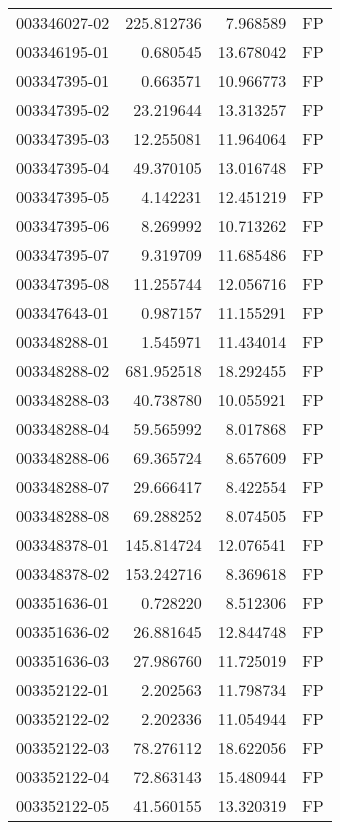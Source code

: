 \begin{tabular}{lrrl}
003346027-02 &  225.812736 &       7.968589 &   FP \\
003346195-01 &    0.680545 &      13.678042 &   FP \\
003347395-01 &    0.663571 &      10.966773 &   FP \\
003347395-02 &   23.219644 &      13.313257 &   FP \\
003347395-03 &   12.255081 &      11.964064 &   FP \\
003347395-04 &   49.370105 &      13.016748 &   FP \\
003347395-05 &    4.142231 &      12.451219 &   FP \\
003347395-06 &    8.269992 &      10.713262 &   FP \\
003347395-07 &    9.319709 &      11.685486 &   FP \\
003347395-08 &   11.255744 &      12.056716 &   FP \\
003347643-01 &    0.987157 &      11.155291 &   FP \\
003348288-01 &    1.545971 &      11.434014 &   FP \\
003348288-02 &  681.952518 &      18.292455 &   FP \\
003348288-03 &   40.738780 &      10.055921 &   FP \\
003348288-04 &   59.565992 &       8.017868 &   FP \\
003348288-06 &   69.365724 &       8.657609 &   FP \\
003348288-07 &   29.666417 &       8.422554 &   FP \\
003348288-08 &   69.288252 &       8.074505 &   FP \\
003348378-01 &  145.814724 &      12.076541 &   FP \\
003348378-02 &  153.242716 &       8.369618 &   FP \\
003351636-01 &    0.728220 &       8.512306 &   FP \\
003351636-02 &   26.881645 &      12.844748 &   FP \\
003351636-03 &   27.986760 &      11.725019 &   FP \\
003352122-01 &    2.202563 &      11.798734 &   FP \\
003352122-02 &    2.202336 &      11.054944 &   FP \\
003352122-03 &   78.276112 &      18.622056 &   FP \\
003352122-04 &   72.863143 &      15.480944 &   FP \\
003352122-05 &   41.560155 &      13.320319 &   FP \\

\end{tabular}
